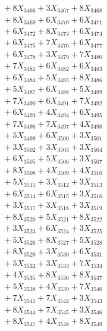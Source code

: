 \documentclass[a4paper,10pt]{article}
\begin{document}
{\begin{align}
&\;  + 8 X_{3466} + 3 X_{3467} + 8 X_{3468} \\[0.3ex]
&\;  + 8 X_{3469} + 6 X_{3470} + 6 X_{3471} \\[0.3ex]
&\;  + 6 X_{3472} + 8 X_{3473} + 6 X_{3474} \\[0.3ex]
&\;  + 6 X_{3475} + 7 X_{3476} + 6 X_{3477} \\[0.3ex]
&\;  + 6 X_{3478} + 3 X_{3479} + 7 X_{3480} \\[0.3ex]
&\;  + 7 X_{3481} + 6 X_{3482} + 6 X_{3483} \\[0.3ex]
&\;  + 6 X_{3484} + 5 X_{3485} + 8 X_{3486} \\[0.3ex]
&\;  + 5 X_{3487} + 6 X_{3488} + 5 X_{3489} \\[0.5ex]\allowbreak
&\;  + 7 X_{3490} + 6 X_{3491} + 7 X_{3492} \\[0.3ex]
&\;  + 6 X_{3493} + 4 X_{3494} + 6 X_{3495} \\[0.3ex]
&\;  + 7 X_{3496} + 7 X_{3497} + 4 X_{3498} \\[0.3ex]
&\;  + 5 X_{3499} + 6 X_{3500} + 3 X_{3501} \\[0.3ex]
&\;  + 3 X_{3502} + 3 X_{3503} + 3 X_{3504} \\[0.3ex]
&\;  + 6 X_{3505} + 5 X_{3506} + 3 X_{3507} \\[0.3ex]
&\;  + 8 X_{3508} + 4 X_{3509} + 4 X_{3510} \\[0.3ex]
&\;  + 5 X_{3511} + 3 X_{3512} + 3 X_{3513} \\[0.3ex]
&\;  + 6 X_{3514} + 6 X_{3515} + 3 X_{3516} \\[0.3ex]
&\;  + 3 X_{3517} + 3 X_{3518} + 3 X_{3519} \\[0.5ex]\allowbreak
&\;  + 8 X_{3520} + 5 X_{3521} + 8 X_{3522} \\[0.3ex]
&\;  + 3 X_{3523} + 6 X_{3524} + 3 X_{3525} \\[0.3ex]
&\;  + 5 X_{3526} + 8 X_{3527} + 5 X_{3528} \\[0.3ex]
&\;  + 8 X_{3529} + 3 X_{3530} + 6 X_{3531} \\[0.3ex]
&\;  + 5 X_{3532} + 3 X_{3533} + 7 X_{3534} \\[0.3ex]
&\;  + 4 X_{3535} + 8 X_{3536} + 8 X_{3537} \\[0.3ex]
&\;  + 5 X_{3538} + 4 X_{3539} + 7 X_{3540} \\[0.3ex]
&\;  + 7 X_{3541} + 7 X_{3542} + 3 X_{3543} \\[0.3ex]
&\;  + 8 X_{3544} + 7 X_{3545} + 3 X_{3546} \\[0.3ex]
&\;  + 8 X_{3547} + 4 X_{3548} + 8 X_{3549} \\[0.5ex]\allowbreak

\end{align}}
\end{document}
